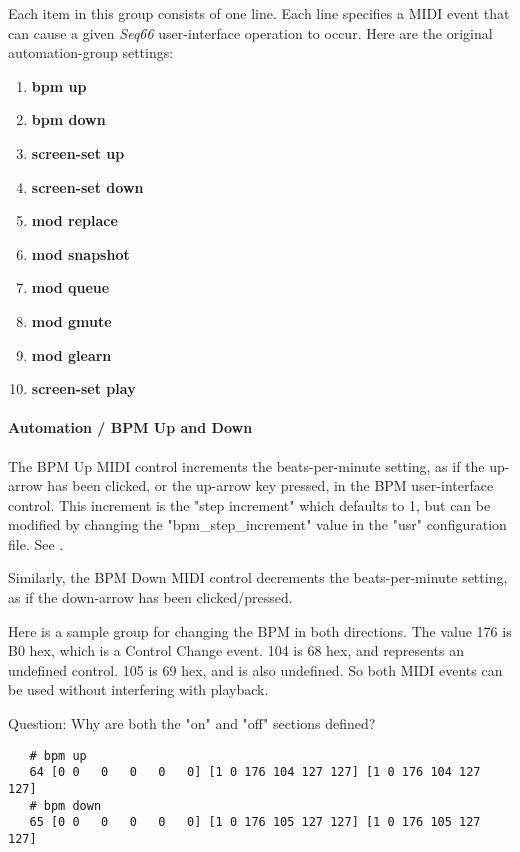    Each item in this group consists of one line.  Each line
   specifies a MIDI event that can cause a given
   \textsl{Seq66} user-interface operation to occur.
   Here are the original automation-group settings:

   \begin{enumerate}
      \item \textbf{bpm up}
      \item \textbf{bpm down}
      \item \textbf{screen-set up}
      \item \textbf{screen-set down}
      \item \textbf{mod replace}
      \item \textbf{mod snapshot}
      \item \textbf{mod queue}
      \item \textbf{mod gmute}
      \item \textbf{mod glearn}
      \item \textbf{screen-set play}
   \end{enumerate}

\paragraph{Automation / BPM Up and Down}
\label{paragraph:rc_file_midi_ctrl_bpmupdn}

   The BPM Up MIDI control increments the beats-per-minute setting, as if
   the up-arrow has been clicked, or the up-arrow key pressed, in
   the BPM user-interface control.
   This increment is the
   "step increment" which defaults to 1, but can be modified by
   changing the "bpm\_step\_increment" value in the "usr"
   configuration file.
   See .

   Similarly, the BPM Down MIDI control decrements the beats-per-minute
   setting, as if the down-arrow has been clicked/pressed.

   Here is a sample group for changing the BPM in both directions.  The value
   176 is B0 hex, which is a Control Change event.  104 is 68 hex, and
   represents an undefined control.  105 is 69 hex, and is also undefined. So
   both MIDI events can be used without interfering with playback.

   Question: Why are both the "on" and "off" sections defined?

   \begin{verbatim}
   # bpm up
   64 [0 0   0   0   0   0] [1 0 176 104 127 127] [1 0 176 104 127 127]
   # bpm down
   65 [0 0   0   0   0   0] [1 0 176 105 127 127] [1 0 176 105 127 127]
   \end{verbatim}

